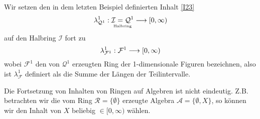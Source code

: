 \begin{example}
Wir setzen den in dem letzten Beispiel definierten Inhalt \eqref{I23}
\begin{equation*}
\lambda^1_{\mathcal{Q}^1}: \underset{\text{\tiny{Halbring}}}{\mathcal{I} = \mathcal{Q}^1} \longrightarrow [0,\infty)
\end{equation*} auf den Halbring $\mathcal{I}$ fort zu
\begin{equation*}
\lambda^1_{\mathcal{F}^1}:\mathcal{F}^1 \longrightarrow [0,\infty)
\end{equation*}
wobei $\mathcal{F}^1$ den von $\mathcal{Q}^1$ erzeugten Ring der 1-dimensionale Figuren bezeichnen, also ist $\lambda^1_{\mathcal{F}}$ definiert als die Summe der Längen der Teilintervalle.
\end{example}
\begin{remark}
Die Fortsetzung von Inhalten von Ringen auf Algebren ist nicht eindeutig. Z.B. betrachten wir die vom Ring $\mathcal{R}=\{ \emptyset\}$ erzeugte Algebra $\mathcal{A} = \{ \emptyset, X\}$, so können wir den Inhalt von $X$ beliebig $\in [0,\infty)$ wählen.
\end{remark}
